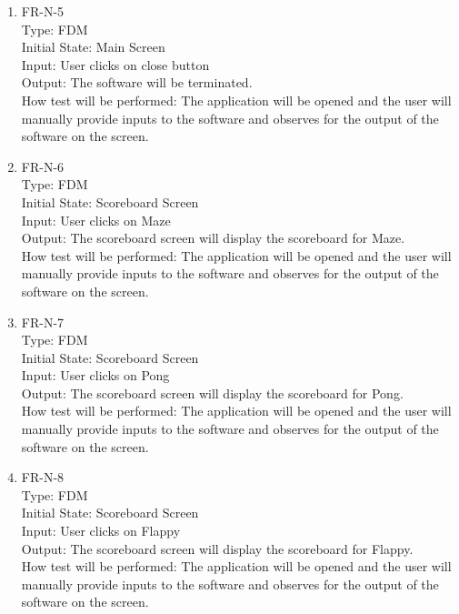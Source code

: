 \documentclass[12pt, titlepage]{article}
\begin{document}
\begin{enumerate}
\item{FR-N-5\\}
Type: FDM\\
Initial State: Main Screen\\
Input: User clicks on close button\\
Output: The software will be terminated.\\
How test will be performed: The application will be opened and the user will manually provide inputs to the software and observes for the output of the software on the screen.\\

\item{FR-N-6\\}
Type: FDM\\
Initial State: Scoreboard Screen\\
Input: User clicks on Maze\\
Output: The scoreboard screen will display the scoreboard for Maze.\\
How test will be performed: The application will be opened and the user will manually provide inputs to the software and observes for the output of the software on the screen.\\

\item{FR-N-7\\}
Type: FDM\\
Initial State: Scoreboard Screen\\
Input: User clicks on Pong\\
Output: The scoreboard screen will display the scoreboard for Pong.\\
How test will be performed: The application will be opened and the user will manually provide inputs to the software and observes for the output of the software on the screen.\\

\item{FR-N-8\\}
Type: FDM\\
Initial State: Scoreboard Screen\\
Input: User clicks on Flappy\\
Output: The scoreboard screen will display the scoreboard for Flappy.\\
How test will be performed: The application will be opened and the user will manually provide inputs to the software and observes for the output of the software on the screen.\\


\end{enumerate}
\end{document}
